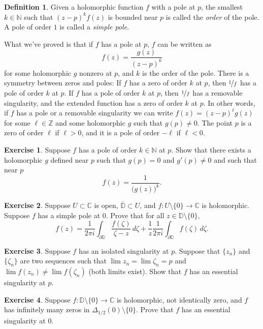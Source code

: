\documentclass[12pt,openany]{book}
\newcommand{\C}{{\mathbb{C}}}
\newcommand{\Z}{{\mathbb{Z}}}
\newcommand{\N}{{\mathbb{N}}}
\newcommand{\D}{{\mathbb{D}}}
\newcommand{\myindex}[1]{#1\index{#1}}
\theoremstyle{plain}
\theoremstyle{remark}
\theoremstyle{definition}
\newtheorem{defn}[thm]{Definition}
\newenvironment{exbox}{%
    \def\FrameCommand{\vrule width 1pt \relax\hspace{10pt}}%
    \MakeFramed{\advance\hsize-\width\FrameRestore}%
}{%
    \endMakeFramed
}
\theoremstyle{exercise}
\newtheorem{exercise}{Exercise}[section]
\theoremstyle{example}
\begin{document}
\begin{defn}
Given a holomorphic function $f$ with a pole at $p$, the smallest $k \in \N$
such that ${(z-p)}^k f(z)$ is bounded near $p$ is called the
\emph{order} of the pole.
A pole of order $1$ is called a \emph{\myindex{simple pole}}.
\end{defn}

What we've proved is that if $f$
has a pole at $p$, $f$ can be written as
\begin{equation*}
f(z) = \frac{g(z)}{{(z-p)}^k}
\end{equation*}
for some holomorphic $g$ nonzero at $p$, and $k$ is the order of the pole.
There is a symmetry between zeros and poles:
If $f$ has a zero of order $k$ at $p$, then $\nicefrac{1}{f}$ has a pole of
order $k$ at $p$.
If $f$ has a pole of order $k$ at $p$, then $\nicefrac{1}{f}$
has a removable singularity, and the extended function has a zero of order
$k$ at $p$.
In other words, if $f$ has a pole or a removable singularity we can write
$f(z) = {(z-p)}^\ell g(z)$ for some $\ell \in \Z$ and some holomorphic $g$ such
that $g(p) \not= 0$.
The point $p$ is a zero of order $\ell$ if $\ell
> 0$, and it is a pole of order $-\ell$ if $\ell < 0$.

\begin{exbox}
\begin{exercise}
Suppose $f$ has a pole of order $k \in \N$ at $p$.
Show that there exists a holomorphic $g$ defined near $p$
such that $g(p) = 0$ and $g'(p) \not= 0$ and such that near $p$
\begin{equation*}
f(z) = \frac{1}{{\bigl(g(z)\bigr)}^k} .
\end{equation*}
\end{exercise}

\begin{exercise}
Suppose $U \subset \C$ is open, $\overline{\D} \subset U$,
and $f \colon U \setminus \{0\} \to \C$ is holomorphic.
Suppose $f$ has a simple pole at $0$.  Prove that for all
$z \in \D \setminus \{ 0 \}$,
\begin{equation*}
f(z) =
\frac{1}{2\pi i} \int_{\partial \D}
\frac{f(\zeta)}{\zeta-z} \, d\zeta
+
\frac{1}{z}
\frac{1}{2\pi i} \int_{\partial \D}
f(\zeta) \, d\zeta .
\end{equation*}
\end{exercise}

\begin{exercise}
Suppose $f$ has an isolated singularity at $p$.  Suppose that
$\{ z_n \}$ and $\{ \zeta_n \}$ are two sequences such that
$\lim z_n = \lim \zeta_n = p$ and $\lim f(z_n) \not= \lim f(\zeta_n)$
(both limits exist).
Show that $f$ has an essential singularity at $p$.
\end{exercise}

\begin{exercise}
Suppose $f \colon \D \setminus \{0\} \to \C$ is holomorphic,
not identically zero, and
$f$ has infinitely many zeros in $\Delta_{1/2}(0) \setminus \{ 0 \}$.
Prove that $f$ has an essential singularity at $0$.
\end{exercise}
\end{exbox}
\end{document}
